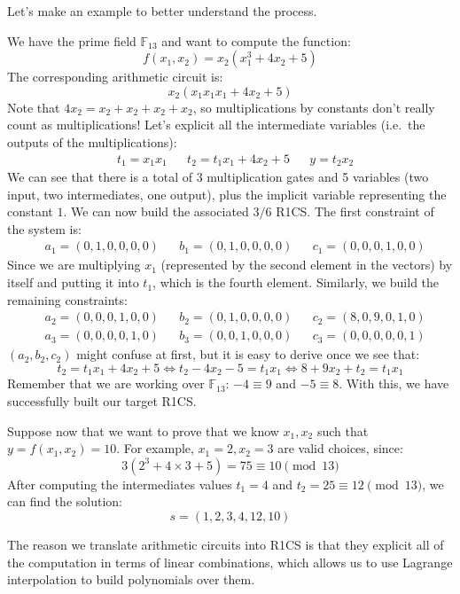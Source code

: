 \noindent Let's make an example to better understand the process.
\begin{example}
	We have the prime field \(\mathbb{F}_{13}\) and want to compute the function:
	\[f(x_1, x_2) = x_2(x_1^3 + 4x_2 + 5)\]
	The corresponding arithmetic circuit is:
	\[x_2(x_1x_1x_1 + 4x_2 + 5)\]
	Note that \(4x_2 = x_2 + x_2 + x_2 + x_2\), so multiplications by constants don't really count as
	multiplications!
	Let's explicit all the intermediate variables (i.e.\ the outputs of the multiplications):
	\begin{align*}
		 & t_1 = x_1x_1 &  & t_2 = t_1x_1 + 4x_2 + 5 &  & y = t_2x_2
	\end{align*}
	We can see that there is a total of 3 multiplication gates and 5 variables
	(two input, two intermediates, one output), plus the implicit variable representing the constant
	\(1\).
	We can now build the associated \(3/6\) R1CS\@.
	The first constraint of the system is:
	\begin{align*}
		 & a_1 = (0, 1, 0, 0, 0, 0) &  & b_1 = (0, 1, 0, 0, 0, 0) &  & c_1 = (0, 0, 0, 1, 0, 0)
	\end{align*}
	Since we are multiplying \(x_1\) (represented by the second element in the vectors) by itself and
	putting it into \(t_1\), which is the fourth element.
	Similarly, we build the remaining constraints:
	\begin{align*}
		 & a_2 = (0, 0, 0, 1, 0, 0) &  & b_2 = (0, 1, 0, 0, 0, 0) &  & c_2 = (8, 0, 9, 0, 1, 0) \\
		 & a_3 = (0, 0, 0, 0, 1, 0) &  & b_3 = (0, 0, 1, 0, 0, 0) &  & c_3 = (0, 0, 0, 0, 0, 1)
	\end{align*}
	\((a_2, b_2, c_2)\) might confuse at first, but it is easy to derive once we see that:
	\[{t_2 = t_1x_1 + 4x_2 + 5} \iff {t_2 - 4x_2 - 5 = t_1x_1} \iff 8 + 9x_2 + t_2 = t_1x_1\]
	Remember that we are working over \(\mathbb{F}_{13}\): \(-4 \equiv 9\) and \(-5 \equiv 8\).
	With this, we have successfully built our target R1CS\@.

	Suppose now that we want to prove that we know \(x_1, x_2\) such that \(y = f(x_1, x_2) = 10\).
	For example, \(x_1 = 2, x_2 = 3\) are valid choices, since:
	\[3(2^3 + 4\times3 + 5) = 75 \equiv 10 \pmod{13}\]
	After computing the intermediates values \(t_1 = 4\) and \(t_2 = 25 \equiv 12 \pmod{13}\),
	we can find the solution:
	\[ s = (1, 2, 3, 4, 12, 10) \]
\end{example}

\noindent The reason we translate arithmetic circuits into R1CS is that they explicit all of the
computation in terms of linear combinations, which allows us to use Lagrange interpolation to
build polynomials over them.


